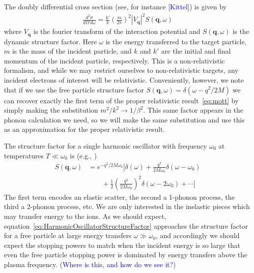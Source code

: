 \documentclass[twocolumn,preprintnumbers,amsmath,amssymb,prl, superscriptaddress]{revtex4}
\begin{document}
\begin{appendices}
The doubly differential cross section (see, for instance \textcolor{blue}{[Kittel]}) is given by
\begin{align}
\frac{d^2 \sigma}{d \Omega\, d \omega} = \frac{k'}{k} \left( \frac{m}{2 \pi} \right)^2 |V_\textbf{q}|^2 S(\textbf{q}, \omega)
\label{eq:DoublyDifferentialCrossSection}
\end{align}
where $V_\textbf{q}$ is the fourier transform of the interaction potential and $S(\textbf{q}, \omega)$ is the dynamic structure factor. Here $\omega$ is the energy transferred to the target particle, $m$ is the mass of the incident particle, and $k$ and $k'$ are the initial and final momentum of the incident particle, respectively. This is a non-relativistic formalism, and while we may restrict ourselves to non-relativistic targets, any incident electrons of interest will be relativistic. Conveniently, however, we note that if we use the free particle structure factor $S(\textbf{q}, \omega) = \delta(\omega - q^2 / 2 M)$ we can recover exactly the first term of the proper relativistic result~\eqref{eq:mott} by simply making the substitution $m^2 / k^2\to 1/\beta^2$. This same factor appears in the phonon calculation we need, so we will make the same substitution and use this as an approximation for the proper relativistic result.

The structure factor for a single harmonic oscillator with frequency $\omega_0$ at temperatures $T\ll \omega_0$ is (e.g., \cite{reference})
\begin{align}
S(\textbf{q}, \omega) &= e^{-q^2 / 2 M \omega_0} \bigg[ \delta(\omega) + \frac{q^2}{2 M \omega_0}\delta(\omega - \omega_0)\nonumber\\
&\qquad + \frac12 \left( \frac{q^2}{2 M \omega_0} \right)^2 \delta(\omega - 2\omega_0) + \cdots \bigg]
\label{eq:HarmonicOscillatorStructureFactor}
\end{align}
The first term encodes an elastic scatter, the second a 1-phonon process, the third a 2-phonon process, etc. We are only interested in the inelastic pieces which may transfer energy to the ions. As we should expect, equation~\eqref{eq:HarmonicOscillatorStructureFactor} approaches the structure factor for a free particle at large energy transfers $\omega \gg \omega_0$, and accordingly we should expect the stopping powers to match when the incident energy is so large that even the free particle stopping power is dominated by energy transfers above the plasma frequency. \textcolor{blue}{(Where is this, and how do we see it?)}


\end{appendices}
\end{document}
